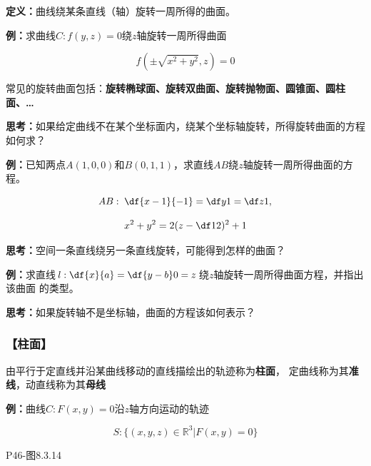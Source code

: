 {\bf 定义：}曲线绕某条直线（轴）旋转一周所得的曲面。

{\bf 例：}求曲线$C:f(y,z)=0$绕$z$轴旋转一周所得曲面

$${f(\pm\sqrt{x^2+y^2},z)=0}$$

常见的旋转曲面包括：{\bf 旋转椭球面、旋转双曲面、旋转抛物面、圆锥面、圆柱面、\ldots}

{\bf 思考：}如果给定曲线不在某个坐标面内，绕某个坐标轴旋转，所得旋转曲面的方程如何求？

{\bf 例：}已知两点$A(1,0,0)$和$B(0,1,1)$，求直线$AB$绕$z$轴旋转一周所得曲面的方程。

$$AB:\;\df{x-1}{-1}=\df y1=\df z1,$$

$$x^2+y^2=2(z-\df12)^2+1$$

{\bf 思考：}空间一条直线绕另一条直线旋转，可能得到怎样的曲面？

{\bf 例：}求直线$l:\df{x}{a}=\df{y-b}0=z$绕$z$轴旋转一周所得曲面方程，并指出该曲面
的类型。

{\bf 思考：}如果旋转轴不是坐标轴，曲面的方程该如何表示？

\subsubsection{【柱面】}

由平行于定直线并沿某曲线移动的直线描绘出的轨迹称为{\bf 柱面}，
定曲线称为其{\bf 准线}，动直线称为其{\bf 母线}

{\bf 例：}曲线$C:F(x,y)=0$沿$z$轴方向运动的轨迹

$${S:\{(x,y,z)\in\mathbb{R}^3|F(x,y)=0\}}$$

\begin{center}
	
	P46-图8.3.14
\end{center}

